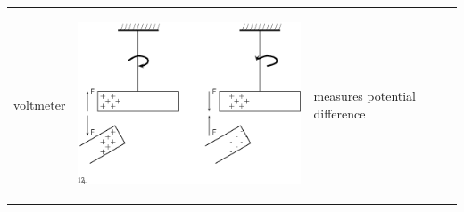 \begin{center}
\begin{xtabular*}{\mytablewidth}[t]{|p{10\mystarwidth}|p{10\mystarwidth}|p{10\mystarwidth}|}
     \tabularnewline{}
    
    
        voltmeter &
    
    
        
                    
    \setcounter{subfigure}{0}

\label{m38771*id63089}
    \begin{center}
    \label{m38771*id63089!!!underscore!!!media}\label{m38771*id63089!!!underscore!!!printimage}\includegraphics{col11305.imgs/m38771_PG10C9_006.png} %
        
      \vspace{2pt}
    \vspace{.1in}
    
    \end{center}



    \addtocounter{footnote}{-0}
    
                   &
    
    
        measures potential difference%
     \tabularnewline{}
    

\end{xtabular*}
\end{center}
